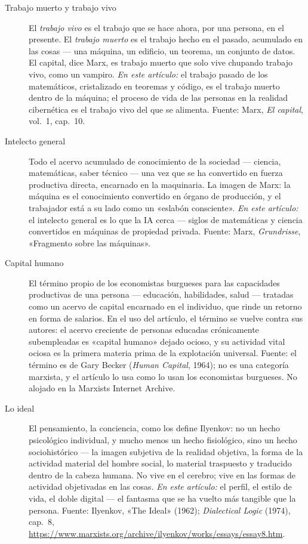 \documentclass[11pt]{article}
\begin{document}
\begin{description}
\item[Trabajo muerto y trabajo vivo] El \emph{trabajo vivo} es el trabajo
que se hace ahora, por una persona, en el presente. El \emph{trabajo
muerto} es el trabajo hecho en el pasado, acumulado en las cosas ---
una máquina, un edificio, un teorema, un conjunto de datos. El capital,
dice Marx, es trabajo muerto que solo vive chupando trabajo vivo, como
un vampiro. \emph{En este artículo:} el trabajo pasado de los
matemáticos, cristalizado en teoremas y código, es el trabajo muerto
dentro de la máquina; el proceso de vida de las personas en la realidad
cibernética es el trabajo vivo del que se alimenta. Fuente: Marx,
\emph{El capital}, vol.~1, cap.~10.

\item[Intelecto general] Todo el acervo acumulado de conocimiento de la
sociedad --- ciencia, matemáticas, saber técnico --- una vez que se ha
convertido en fuerza productiva directa, encarnado en la maquinaria.
La imagen de Marx: la máquina es el conocimiento convertido en órgano
de producción, y el trabajador está a su lado como un «eslabón
consciente». \emph{En este artículo:} el intelecto general es lo que
la IA cerca --- siglos de matemáticas y ciencia convertidos en máquinas
de propiedad privada. Fuente: Marx, \emph{Grundrisse}, «Fragmento
sobre las máquinas».

\item[Capital humano] El término propio de los economistas burgueses
para las capacidades productivas de una persona --- educación,
habilidades, salud --- tratadas como un acervo de capital encarnado en
el individuo, que rinde un retorno en forma de salarios. En el uso del
artículo, el término se vuelve contra sus autores: el acervo creciente
de personas educadas crónicamente subempleadas es «capital humano»
dejado ocioso, y su actividad vital ociosa es la primera materia prima
de la explotación universal. Fuente: el término es de Gary Becker
(\emph{Human Capital}, 1964); no es una categoría marxista, y el
artículo lo usa como lo usan los economistas burgueses. No alojado en
la Marxists Internet Archive.

\item[Lo ideal] El pensamiento, la conciencia, como los define Ilyenkov:
no un hecho psicológico individual, y mucho menos un hecho fisiológico,
sino un hecho sociohistórico --- la imagen subjetiva de la realidad
objetiva, la forma de la actividad material del hombre social, lo
material traspuesto y traducido dentro de la cabeza humana. No vive en
el cerebro; vive en las formas de actividad objetivadas en las cosas.
\emph{En este artículo:} el perfil, el estilo de vida, el doble
digital --- el fantasma que se ha vuelto más tangible que la persona.
Fuente: Ilyenkov, «The Ideal» (1962); \textit{Dialectical Logic}
(1974), cap.~8,
\url{https://www.marxists.org/archive/ilyenkov/works/essays/essay8.htm}.


\end{description}
\end{document}
